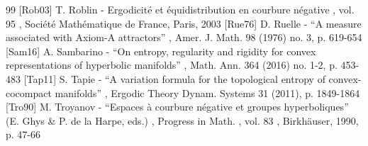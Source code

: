 \documentclass[11pt]{article}
\begin{document}
\begin{thebibliography}{99}
 [Rob03] T. Roblin - Ergodicité et équidistribution en courbure négative , vol. 95 , Société Mathématique de France, Paris, 2003
 [Rue76] D. Ruelle - “A measure associated with Axiom-A attractors” , Amer. J. Math. 98 (1976) no. 3, p. 619-654
 [Sam16] A. Sambarino - “On entropy, regularity and rigidity for convex representations of hyperbolic manifolds” , Math. Ann. 364 (2016) no. 1-2, p. 453-483
 [Tap11] S. Tapie - “A variation formula for the topological entropy of convex-cocompact manifolds” , Ergodic Theory Dynam. Systems 31 (2011), p. 1849-1864
 [Tro90] M. Troyanov - “Espaces à courbure négative et groupes hyperboliques” (E. Ghys \& P. de la Harpe, eds.) , Progress in Math. , vol. 83 , Birkhäuser, 1990, p. 47-66
\end{thebibliography}
\end{document}
